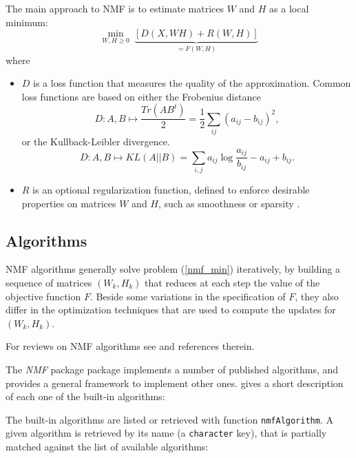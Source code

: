 \documentclass[a4paper]{article}\usepackage[]{graphicx}\usepackage[]{color}
\let\code=\texttt
\newcommand{\pkgname}[1]{\textit{#1}\xspace}
\newcommand{\Rpkg}[1]{\pkgname{#1} package\xspace}
\newcommand{\nmfpack}{\Rpkg{NMF}}
\newcommand{\refeqn}[1]{(\ref{#1})}
\renewcommand{\cite}[1]{\parencite{#1}}
\begin{document}
The main approach to NMF is to estimate matrices $W$ and $H$ as a local minimum:
\begin{equation}
\min_{W, H \geq 0}\ \underbrace{[D(X, WH) + R(W, H)]}_{=F(W,H)} \label{nmf_min}
\end{equation}
where 

\begin{itemize}
\item $D$ is a loss function that measures the quality of the approximation. 
Common loss functions are based on either the Frobenius distance 
$$D: A,B\mapsto \frac{Tr(AB^t)}{2} = \frac{1}{2} \sum_{ij} (a_{ij} - b_{ij})^2,$$
or the Kullback-Leibler divergence.
$$D: A,B\mapsto KL(A||B) = \sum_{i,j} a_{ij} \log \frac{a_{ij}}{b_{ij}} - a_{ij} + b_{ij}.$$
\item $R$ is an optional regularization function, defined to enforce desirable
properties on matrices $W$ and $H$, such as smoothness or sparsity
\cite{Cichocki2008}.
\end{itemize}

\subsection{Algorithms}
NMF algorithms generally solve problem \refeqn{nmf_min} iteratively, by building a sequence of matrices $(W_k,H_k)$ that reduces at each step the value of the objective function $F$.
Beside some variations in the specification of $F$, they also differ in the optimization techniques that are used to compute the updates for $(W_k,H_k)$.

For reviews on NMF algorithms see \cite{Berry2007, Chu2004} and references therein.

The \nmfpack package implements a number of published algorithms, and provides a general framework to implement other ones.
 gives a short description of each one of the built-in algorithms:

The built-in algorithms are listed or retrieved with function \code{nmfAlgorithm}. 
A given algorithm is retrieved by its name (a \code{character} key), that is partially matched against the list of available algorithms:
\end{document}
